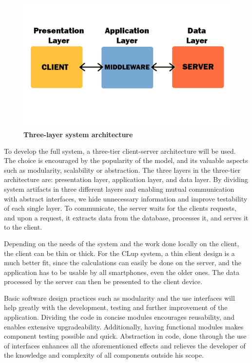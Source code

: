 \begin{figure}[!h]
\centering
\includegraphics[width=\textwidth]{Images/ThreeLayers}
\caption{\label{fig:arch}\textbf{Three-layer system architecture}}
\end{figure}

To develop the full system, a three-tier client-server architecture will be used.  The choice is encouraged by the popularity of the model, and its valuable aspects such as modularity, scalability or abstraction. The three layers in the three-tier architecture are: presentation layer, application layer, and data layer. By dividing system artifacts in three different layers and enabling mutual communication with abstract interfaces, we hide unnecessary information and improve testability of each single layer. To communicate, the server waits for the clients requests, and upon a request, it extracts data from the database, processes it, and serves it to the client.  

Depending on the needs of the system and the work done locally on the client, the client can be thin or thick. For the CLup system, a thin client design is a much better fit, since the calculations can easily be done on the server, and the application has to be usable by all smartphones, even the older ones. The data processed by the server can then be presented to the client device. \newline

Basic software design practices such as modularity and the use interfaces will help greatly with the development, testing and further improvement of the application. Dividing the code in concise modules encourages reusability, and enables extensive upgradeability. Additionally, having functional modules makes component testing possible and quick. Abstraction in code, done through the use of interfaces enhances all the aforementioned effects and relieves the developer of the knowledge and complexity of all components outside his scope. \newline

